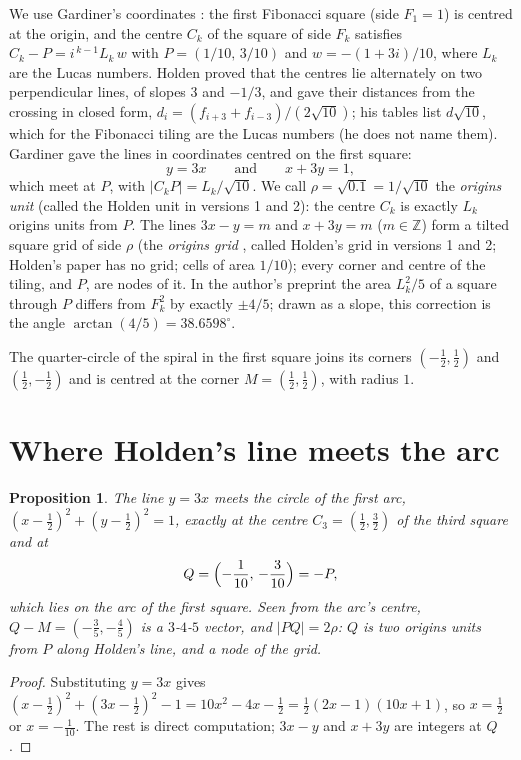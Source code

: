 \documentclass[11pt,a4paper]{article}
\theoremstyle{plain}
\newtheorem{proposition}[theorem]{Proposition}
\theoremstyle{definition}
\theoremstyle{remark}
\begin{document}
We use Gardiner's coordinates \cite{gardiner}: the first Fibonacci square (side $F_1=1$) is centred at the origin, and the centre $C_k$ of the square of side $F_k$ satisfies $C_k - P = i^{\,k-1} L_k\, w$ with $P=(1/10,\,3/10)$ and $w=-(1+3i)/10$, where $L_k$ are the Lucas numbers. Holden \cite{holden} proved that the centres lie alternately on two perpendicular lines, of slopes $3$ and $-1/3$, and gave their distances from the crossing in closed form, $d_i=(f_{i+3}+f_{i-3})/(2\sqrt{10})$; his tables list $d\sqrt{10}$, which for the Fibonacci tiling are the Lucas numbers (he does not name them). Gardiner \cite{gardiner} gave the lines in coordinates centred on the first square:
\[
  y = 3x \qquad\text{and}\qquad x + 3y = 1,
\]
which meet at $P$, with $|C_kP| = L_k/\sqrt{10}$. We call $\rho=\sqrt{0.1}=1/\sqrt{10}$ the \emph{origins unit} \cite{origins} (called the Holden unit in versions 1 and 2): the centre $C_k$ is exactly $L_k$ origins units from $P$. The lines $3x-y=m$ and $x+3y=m$ ($m\in\mathbb{Z}$) form a tilted square grid of side $\rho$ (the \emph{origins grid} \cite{origins}, called Holden's grid in versions 1 and 2; Holden's paper has no grid; cells of area $1/10$); every corner and centre of the tiling, and $P$, are nodes of it. In the author's preprint \cite{gt} the area $L_k^2/5$ of a square through $P$ differs from $F_k^2$ by exactly $\pm 4/5$; drawn as a slope, this correction is the angle $\arctan(4/5)=38.6598^\circ$.

The quarter-circle of the spiral in the first square joins its corners $(-\tfrac12,\tfrac12)$ and $(\tfrac12,-\tfrac12)$ and is centred at the corner $M=(\tfrac12,\tfrac12)$, with radius $1$.

\section{Where Holden's line meets the arc}

\begin{proposition}\label{prop:Q}
The line $y=3x$ meets the circle of the first arc, $(x-\tfrac12)^2+(y-\tfrac12)^2=1$, exactly at the centre $C_3=(\tfrac12,\tfrac32)$ of the third square and at
\[
  Q=\Bigl(-\frac{1}{10},\,-\frac{3}{10}\Bigr) = -P ,
\]
which lies on the arc of the first square. Seen from the arc's centre, $Q-M=(-\tfrac35,-\tfrac45)$ is a $3$-$4$-$5$ vector, and $|PQ| = 2\rho$: $Q$ is two origins units from $P$ along Holden's line, and a node of the grid.
\end{proposition}

\begin{proof}
Substituting $y=3x$ gives $(x-\tfrac12)^2+(3x-\tfrac12)^2-1 = 10x^2-4x-\tfrac12 = \tfrac12(2x-1)(10x+1)$, so $x=\tfrac12$ or $x=-\tfrac1{10}$. The rest is direct computation; $3x-y$ and $x+3y$ are integers at $Q$.
\end{proof}
\end{document}
